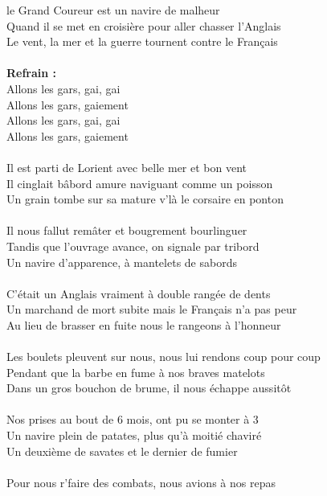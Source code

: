 
 le Grand Coureur est un navire de malheur
\\Quand il se met en croisière pour aller chasser l'Anglais
\\Le vent, la mer et la guerre tournent contre le Français
\\\\\textbf{Refrain :}
\\Allons les gars, gai, gai
\\Allons les gars, gaiement
\\Allons les gars, gai, gai
\\Allons les gars, gaiement
\\\\Il est parti de Lorient avec belle mer et bon vent
\\Il cinglait bâbord amure naviguant comme un poisson
\\Un grain tombe sur sa mature v'là le corsaire en ponton
\\\\Il nous fallut remâter et bougrement bourlinguer
\\Tandis que l'ouvrage avance, on signale par tribord
\\Un navire d'apparence, à mantelets de sabords
\\\\C'était un Anglais vraiment à double rangée de dents
\\Un marchand de mort subite mais le Français n'a pas peur
\\Au lieu de brasser en fuite nous le rangeons à l'honneur
\\\\Les boulets pleuvent sur nous, nous lui rendons coup pour coup
\\Pendant que la barbe en fume à nos braves matelots
\\Dans un gros bouchon de brume, il nous échappe aussitôt
\\\\Nos prises au bout de 6 mois, ont pu se monter à 3
\\Un navire plein de patates, plus qu'à moitié chaviré
\\Un deuxième de savates et le dernier de fumier
\\\\Pour nous r'faire des combats, nous avions à nos repas
